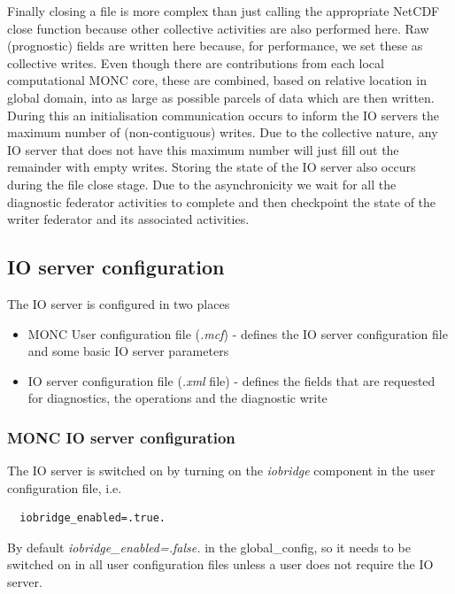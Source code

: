 \documentclass[a4paper,11pt]{article}
\begin{document}
Finally closing a file is more complex than just calling the appropriate
NetCDF close function because other collective activities are also performed
here. Raw (prognostic) fields are written here because, for performance, we set
these as collective writes. Even though there are contributions from each local
computational MONC core, these are combined, based on relative location in
global domain, into as large as possible parcels of data which are then written.
During this an initialisation communication occurs to inform the IO servers
the maximum number of (non-contiguous) writes. Due to the collective nature, any IO
server that does not have this maximum number will just fill out the remainder
with empty writes. Storing the state of the IO server also occurs during the
file close stage. Due to the asynchronicity we wait for all the diagnostic
federator activities to complete and then checkpoint the state of the writer federator
and its associated activities.

\subsection{IO server configuration}

The IO server is configured in two places

\begin{itemize}
  \item {MONC User configuration file (\emph{.mcf}) - defines the
  IO server configuration file and some basic IO server parameters}
  \item {IO server configuration file (\emph{.xml} file) - defines the fields
  that are requested for diagnostics, the operations and the diagnostic write}
\end{itemize}

\subsubsection{MONC IO server configuration}
The IO server is switched on by turning on the \emph{iobridge} component in
the user configuration file, i.e.
\begin{lstlisting}
  iobridge_enabled=.true.
\end{lstlisting}
By default \emph{iobridge\_enabled=.false.} in the global\_config, so
it needs to be switched on in all user configuration files unless a user does
not require the IO server.
\end{document}
